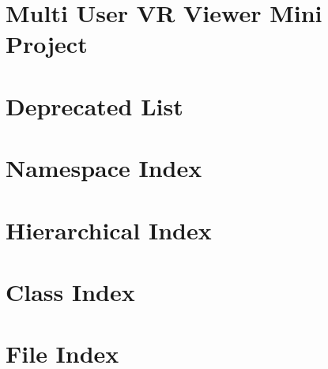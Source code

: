 \let\mypdfximage\pdfximage\def\pdfximage{\immediate\mypdfximage}\documentclass[twoside]{book}
\newcommand{\+}{\discretionary{\mbox{\scriptsize$\hookleftarrow$}}{}{}}
\begin{document}
\chapter{Multi User VR Viewer Mini Project}
\label{md__o_1__git_h_u_b_m_i_n_i_p_roject__r_e_a_d_m_e}

\chapter{Deprecated List}
\label{deprecated}

\chapter{Namespace Index}

\chapter{Hierarchical Index}

\chapter{Class Index}

\chapter{File Index}

\end{document}
